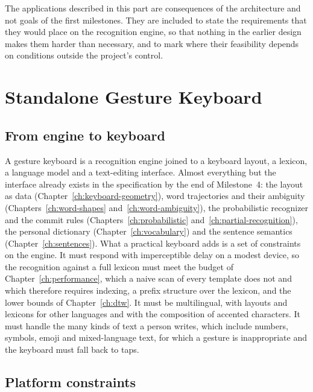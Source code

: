 The applications described in this part are consequences of the architecture and not goals of the first milestones. They are included to state the requirements that they would place on the recognition engine, so that nothing in the earlier design makes them harder than necessary, and to mark where their feasibility depends on conditions outside the project's control.

\chapter{Standalone Gesture Keyboard}\label{ch:standalone-keyboard}

\section{From engine to keyboard}

A gesture keyboard is a recognition engine joined to a keyboard layout, a lexicon, a language model and a text-editing interface. Almost everything but the interface already exists in the specification by the end of Milestone~4: the layout as data (Chapter~\ref{ch:keyboard-geometry}), word trajectories and their ambiguity (Chapters~\ref{ch:word-shapes} and~\ref{ch:word-ambiguity}), the probabilistic recognizer and the commit rules (Chapters~\ref{ch:probabilistic} and~\ref{ch:partial-recognition}), the personal dictionary (Chapter~\ref{ch:vocabulary}) and the sentence semantics (Chapter~\ref{ch:sentences}). What a practical keyboard adds is a set of constraints on the engine. It must respond with imperceptible delay on a modest device, so the recognition against a full lexicon must meet the budget of Chapter~\ref{ch:performance}, which a naive scan of every template does not and which therefore requires indexing, a prefix structure over the lexicon, and the lower bounds of Chapter~\ref{ch:dtw}. It must be multilingual, with layouts and lexicons for other languages and with the composition of accented characters. It must handle the many kinds of text a person writes, which include numbers, symbols, emoji and mixed-language text, for which a gesture is inappropriate and the keyboard must fall back to taps.

\section{Platform constraints}

